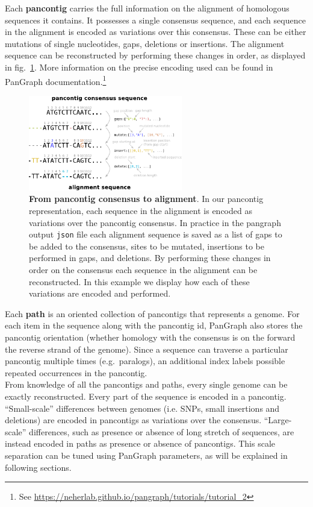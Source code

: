 \documentclass[aps,rmp,reprint,superscriptaddress,notitlepage,10pt,onecolumn]{revtex4-1}
\begin{document}
Each \textbf{pancontig} carries the full information on the alignment of homologous sequences it contains. It possesses a single consensus sequence, and each sequence in the alignment is encoded as variations over this consensus. These can be either mutations of single nucleotides, gaps, deletions or insertions. The alignment sequence can be reconstructed by performing these changes in order, as displayed in fig.~\ref{fig:alignment-reconstruction}. More information on the precise encoding used can be found in PanGraph documentation.\footnote{See \url{https://neherlab.github.io/pangraph/tutorials/tutorial_2}}\\

\begin{figure}[tb]
    \includegraphics[width=0.6\textwidth]{figs_suppl/pancontig_alignment.pdf}
    \caption{{\bf From pancontig consensus to alignment}. In our pancontig representation, each sequence in the alignment is encoded as variations over the pancontig consensus. In practice in the pangraph output \texttt{json} file each alignment sequence is saved as a list of gaps to be added to the consensus, sites to be mutated, insertions to be performed in gaps, and deletions. By performing these changes in order on the consensus each sequence in the alignment can be reconstructed. In this example we display how each of these variations are encoded and performed.
    }
    \label{fig:alignment-reconstruction}
\end{figure}

Each \textbf{path} is an oriented collection of pancontigs that represents a genome. For each item in the sequence along with the pancontig id, PanGraph also stores the pancontig orientation (whether homology with the consensus is on the forward the reverse strand of the genome). 
Since a sequence can traverse a particular pancontig multiple times (e.g.~paralogs), an additional index labels possible repeated occurrences in the pancontig. \\

From knowledge of all the pancontigs and paths, every single genome can be exactly reconstructed. Every part of the sequence is encoded in a pancontig. ``Small-scale'' differences between genomes (i.e. SNPs, small insertions and deletions) are encoded in pancontigs as variations over the consensus. ``Large-scale'' differences, such as presence or absence of long stretch of sequences, are instead encoded in paths as presence or absence of pancontigs. This scale separation can be tuned using PanGraph parameters, as will be explained in following sections.
\end{document}
